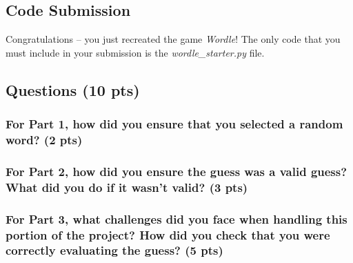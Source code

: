 \documentclass{article}
\begin{document}
\subsection{Code Submission}
Congratulations -- you just recreated the game \emph{Wordle}! The only code that you must include in your submission is the \emph{wordle\_starter.py} file.

\newpage
\subsection{Questions (10 pts)}
\subsubsection{For Part 1, how did you ensure that you selected a random word? (2 pts)}
\vspace{2in}

\subsubsection{For Part 2, how did you ensure the guess was a valid guess? What did you do if it wasn't valid? (3 pts)}
\vspace{2in}

\subsubsection{For Part 3, what challenges did you face when handling this portion of the project? How did you check that you were correctly evaluating the guess? (5 pts)}
\vspace{2in}
\end{document}
